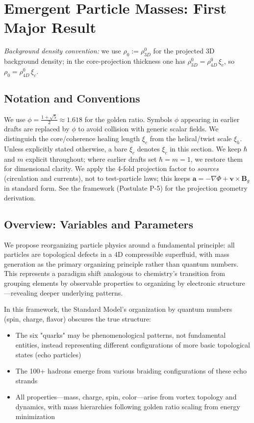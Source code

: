 \section{Emergent Particle Masses: First Major Result}\label{sec:emergent-particles}

\noindent\textit{Background density convention:} we use $\rho_0 := \rho_{3D}^0$ for the projected 3D background density; in the core-projection thickness one has $\rho_{3D}^0 = \rho_{4D}^0\,\xi_c$, so $\rho_0 = \rho_{4D}^0\,\xi_c$.

\subsection*{Notation and Conventions}
We use $\phi=\frac{1+\sqrt{5}}{2}\approx 1.618$ for the golden ratio. Symbols $\phi$ appearing in earlier drafts are replaced by $\phi$ to avoid collision with generic scalar fields.
We distinguish the core/coherence healing length $\xi_c$ from the helical/twist scale $\xi_h$. Unless explicitly stated otherwise, a bare $\xi_c$ denotes $\xi_c$ in this section.
We keep $\hbar$ and $m$ explicit throughout; where earlier drafts set $\hbar=m=1$, we restore them for dimensional clarity.
We apply the 4-fold projection factor to \emph{sources} (circulation and currents), not to test-particle laws; this keeps $\mathbf{a}=-\nabla\Phi+\mathbf{v}\times\mathbf{B}_g$ in standard form. See the framework (Postulate P-5) for the projection geometry derivation.


\subsection{Overview: Variables and Parameters}

We propose reorganizing particle physics around a fundamental principle: all particles are topological defects in a 4D compressible superfluid, with mass generation as the primary organizing principle rather than quantum numbers. This represents a paradigm shift analogous to chemistry's transition from grouping elements by observable properties to organizing by electronic structure—revealing deeper underlying patterns.

In this framework, the Standard Model's organization by quantum numbers (spin, charge, flavor) obscures the true structure:
\begin{itemize}
\item The six "quarks" may be phenomenological patterns, not fundamental entities, instead representing different configurations of more basic topological states (echo particles)
\item The 100+ hadrons emerge from various braiding configurations of these echo strands
\item All properties—mass, charge, spin, color—arise from vortex topology and dynamics, with mass hierarchies following golden ratio scaling from energy minimization
\end{itemize}

